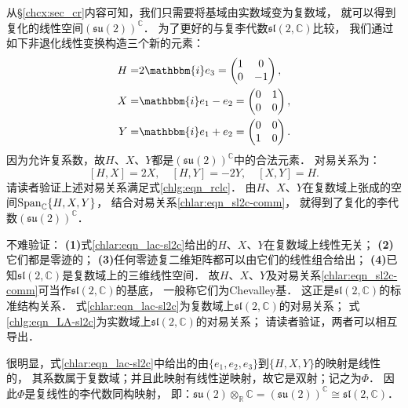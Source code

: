 从\S\ref{chcx:sec_cr}内容可知，我们只需要将基域由实数域变为复数域，
就可以得到复化的线性空间$\left(\mathfrak{su}(2)\right)^{\mathbb{C}}$．
为了更好的与复李代数$\mathfrak{sl}(2, \mathbb{C})$比较，
我们通过如下非退化线性变换构造三个新的元素：
\begin{subequations}\label{chlar:eqn_lac-sl2c}
\begin{align}
	H =& 2\mathbbm{i} e_3 = \begin{pmatrix} 1 & 0 \\ 0 & -1 \end{pmatrix} ,\\
	X =& \mathbbm{i}e_1 - e_2 = \begin{pmatrix} 0 & 1 \\ 0 & 0 \end{pmatrix}, \\
	Y =& \mathbbm{i}e_1 + e_2 = \begin{pmatrix} 0 & 0 \\ 1 & 0 \end{pmatrix} .
\end{align}
\end{subequations}
因为允许复系数，故$H$、$X$、$Y$都是$\left(\mathfrak{su}(2)\right)^{\mathbb{C}}$中的合法元素．
对易关系为：
\begin{equation}\label{chlar:eqn_sl2c-comm}
	[H, X] = 2X, \quad [H, Y] = -2Y, \quad [X, Y] = H .
\end{equation}
请读者验证上述对易关系满足式\eqref{chlg:eqn_rclc}．
由$H$、$X$、$Y$在复数域上张成的空间${\rm Span}_{\mathbb{C}}\{H,X,Y\}$，
结合对易关系\eqref{chlar:eqn_sl2c-comm}，
就得到了复化的李代数$\left(\mathfrak{su}(2)\right)^{\mathbb{C}}$．


不难验证：
{\bfseries(1)}式\eqref{chlar:eqn_lac-sl2c}给出的$H$、$X$、$Y$在复数域上线性无关；
{\bfseries(2)}它们都是零迹的；
{\bfseries(3)}任何零迹复二维矩阵都可以由它们的线性组合给出；
{\bfseries(4)}已知$\mathfrak{sl}(2, \mathbb{C})$是复数域上的三维线性空间．
故$H$、$X$、$Y$及对易关系\eqref{chlar:eqn_sl2c-comm}可当作$\mathfrak{sl}(2, \mathbb{C})$的基底，
一般称它们为Chevalley基．
这正是$\mathfrak{sl}(2, \mathbb{C})$的标准结构关系．
式\eqref{chlar:eqn_lac-sl2c}为复数域上$\mathfrak{sl}(2, \mathbb{C})$的对易关系；
式\eqref{chlg:eqn_LA-sl2c}为实数域上$\mathfrak{sl}(2, \mathbb{C})$的对易关系；
请读者验证，两者可以相互导出．

很明显，式\eqref{chlar:eqn_lac-sl2c}中给出的由$\{e_1,e_2,e_3\}$到$\{H,X,Y\}$的映射是线性的，
其系数属于复数域；并且此映射有线性逆映射，故它是双射；记之为$\Phi$．
因此$\Phi$是{\kaishu 复线性的李代数同构映射}，
即：$\mathfrak{su}(2) \otimes_{\mathbb{R}} \mathbb{C} 
= \left(\mathfrak{su}(2)\right)^{\mathbb{C}} \cong \mathfrak{sl}(2, \mathbb{C})$．


